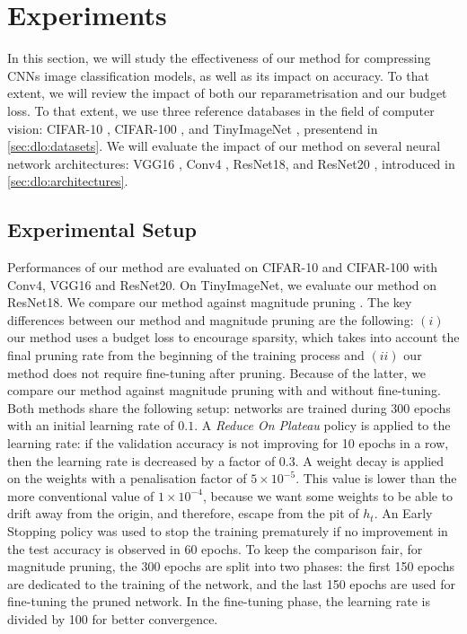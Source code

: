 
\section{Experiments}\label{sec:chap1:experiments}

In this section, we will study the effectiveness of our method for compressing
\aclp{CNN} image classification models, as well as its impact on accuracy. To
that extent, we will review the impact of both our reparametrisation and our
budget loss. To that extent, we use three reference databases in the field of
computer vision: CIFAR-10 \cite{CIFARdataset}, CIFAR-100 \cite{CIFARdataset},
and TinyImageNet \cite{TinyImageNet}, presentend in \cref{sec:dlo:datasets}.
We will evaluate the impact of our method on several neural network
architectures: VGG16 \cite{DBLP:journals/corr/SimonyanZ14a}, Conv4
\cite{DBLP:conf/iclr/FrankleC19}, ResNet18, and ResNet20
\cite{DBLP:conf/cvpr/HeZRS16}, introduced in \cref{sec:dlo:architectures}.\\


\subsection{Experimental Setup}\label{sec:chap1:experimental_setup}

Performances of our method are evaluated on CIFAR-10 and CIFAR-100 with Conv4,
VGG16 and ResNet20. On TinyImageNet, we evaluate our method on ResNet18. We
compare our method against magnitude pruning \cite{DBLP:conf/nips/HanPTD15}. The
key differences between our method and magnitude pruning are the following:
$(i)$ our method uses a budget loss to encourage sparsity, which takes into
account the final pruning rate from the beginning of the training process and
$(ii)$ our method does not require fine-tuning after pruning. Because of the
latter, we compare our method against magnitude pruning with and without
fine-tuning. Both methods share the following setup: networks are trained during
300 epochs with an initial learning rate of $0.1$. A \emph{Reduce On Plateau}
policy is applied to the learning rate: if the validation accuracy is not
improving for 10 epochs in a row, then the learning rate is decreased by a
factor of $0.3$. A weight decay is applied on the weights with a penalisation
factor of $5\times10^{−5}$. This value is lower than the more conventional value
of $1\times10^{-4}$, because we want some weights to be able to drift away from
the origin, and therefore, escape from the pit of $h_t$. An Early Stopping
policy was used to stop the training prematurely if no improvement in the test
accuracy is observed in 60 epochs. To keep the comparison fair, for magnitude
pruning, the 300 epochs are split into two phases: the first 150 epochs are
dedicated to the training of the network, and the last 150 epochs are used for
fine-tuning the pruned network. In the fine-tuning phase, the learning rate is
divided by 100 for better convergence. \\


